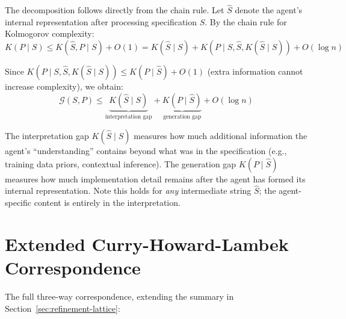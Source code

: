 \documentclass[11pt, a4paper, logo, copyright]{googledeepmind}
\begin{document}
The decomposition follows directly from the chain rule. Let $\hat{S}$ denote the agent's internal representation after processing specification $S$. By the chain rule for Kolmogorov complexity:
\begin{equation}
    K(P \mid S) \leq K(\hat{S}, P \mid S) + O(1) = K(\hat{S} \mid S) + K(P \mid S, \hat{S}, K(\hat{S} \mid S)) + O(\log n)
\end{equation}

Since $K(P \mid S, \hat{S}, K(\hat{S} \mid S)) \leq K(P \mid \hat{S}) + O(1)$ (extra information cannot increase complexity), we obtain:
\begin{equation}
    \mathcal{G}(S, P) \leq \underbrace{K(\hat{S} \mid S)}_{\text{interpretation gap}} + \underbrace{K(P \mid \hat{S})}_{\text{generation gap}} + O(\log n)
\end{equation}

The interpretation gap $K(\hat{S} \mid S)$ measures how much additional information the agent's ``understanding'' contains beyond what was in the specification (e.g., training data priors, contextual inference). The generation gap $K(P \mid \hat{S})$ measures how much implementation detail remains after the agent has formed its internal representation. Note this holds for \emph{any} intermediate string $\hat{S}$; the agent-specific content is entirely in the interpretation.


\section{Extended Curry-Howard-Lambek Correspondence}
\label{app:chl}

The full three-way correspondence, extending the summary in Section~\ref{sec:refinement-lattice}:
\end{document}
